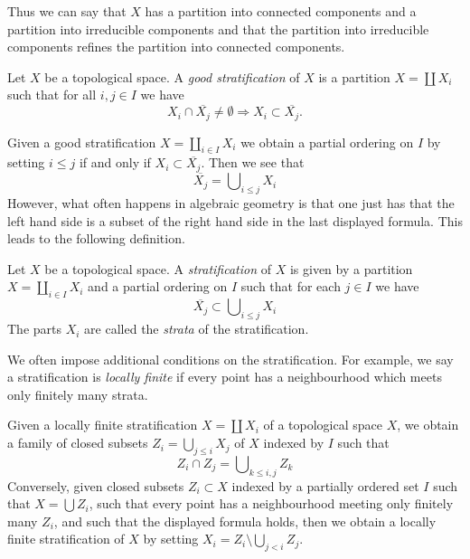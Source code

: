 \noindent
Thus we can say that $X$ has a partition into connected components
and a partition into irreducible components and that the partition
into irreducible components refines the partition into connected
components.

\begin{definition}
\label{definition-good-stratification}
Let $X$ be a topological space. A {\it good stratification}
of $X$ is a partition $X = \coprod X_i$ such that for all
$i, j \in I$ we have
$$
X_i \cap \overline{X_j} \not = \emptyset
\Rightarrow
X_i \subset \overline{X_j}.
$$
\end{definition}

\noindent
Given a good stratification $X = \coprod_{i \in I} X_i$ we obtain
a partial ordering on $I$ by setting $i \leq j$ if and only if
$X_i \subset \overline{X_j}$. Then we see that
$$
\overline{X_j} = \bigcup\nolimits_{i \leq j} X_i
$$
However, what often happens in algebraic geometry is that one just
has that the left hand side is a subset of the right hand side in
the last displayed formula. This leads to the following definition.

\begin{definition}
\label{definition-stratification}
Let $X$ be a topological space. A {\it stratification} of $X$ is
given by a partition $X = \coprod_{i \in I} X_i$ and a partial ordering
on $I$ such that for each $j \in I$ we have
$$
\overline{X_j} \subset \bigcup\nolimits_{i \leq j} X_i
$$
The parts $X_i$ are called the {\it strata} of the stratification.
\end{definition}

\noindent
We often impose additional conditions on the stratification.
For example, we say a stratification is {\it locally finite}
if every point has a neighbourhood which meets only finitely
many strata.

\begin{remark}
\label{remark-locally-finite-stratification}
Given a locally finite stratification $X = \coprod X_i$ of a
topological space $X$, we obtain a family of closed subsets
$Z_i = \bigcup_{j \leq i} X_j$ of $X$ indexed by $I$ such that
$$
Z_i \cap Z_j = \bigcup\nolimits_{k \leq i, j} Z_k
$$
Conversely, given closed subsets $Z_i \subset X$ indexed by a partially
ordered set $I$ such that $X = \bigcup Z_i$, such that every point
has a neighbourhood meeting only finitely many $Z_i$, and such that
the displayed formula holds, then we obtain a locally finite
stratification of $X$ by setting $X_i = Z_i \setminus \bigcup_{j < i} Z_j$.
\end{remark}


